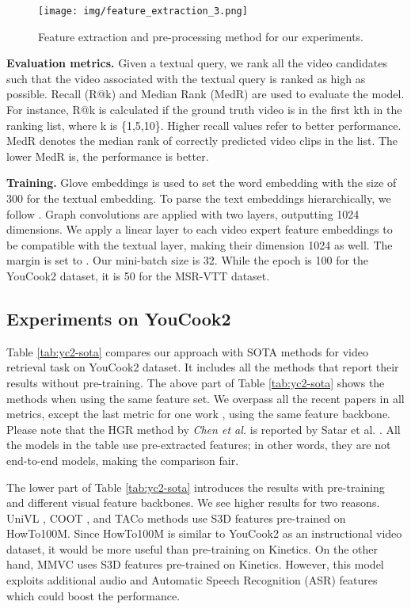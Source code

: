 \documentclass[lettersize,journal]{IEEEtran}
\begin{document}
\begin{figure}[!htb]
\centering
\centerline{\texttt{[image: img/feature\_extraction\_3.png]}}
\centering
\caption{Feature extraction and pre-processing method for our experiments.}
\label{fig:extraction}
\end{figure}

\textbf{Evaluation metrics.} Given a textual query, we rank all the video candidates such that the video associated with the textual query is ranked as high as possible. Recall (R@k) and Median Rank (MedR) are used to evaluate the model. For instance, R@k is calculated if the ground truth video is in the first kth in the ranking list, where k is \{1,5,10\}. Higher recall values refer to better performance. MedR denotes the median rank of correctly predicted video clips in the list. The lower MedR is, the performance is better.

\textbf{Training.} Glove embeddings \cite{pennington-etal-2014-glove} is used to set the word embedding with the size of 300 for the textual embedding. To parse the text embeddings hierarchically, we follow \cite{Chen_2020_CVPR, satar_2021}. Graph convolutions are applied with two layers, outputting 1024 dimensions. We apply a linear layer to each video expert feature embeddings to be compatible with the textual layer, making their dimension 1024 as well. The  margin is set to . Our mini-batch size is 32. While the epoch is 100 for the YouCook2 dataset, it is 50 for the MSR-VTT dataset.

\subsection{Experiments on YouCook2}

Table \ref{tab:yc2-sota} compares our approach with SOTA methods for video retrieval task on YouCook2 dataset. It includes all the methods that report their results without pre-training. The above part of Table \ref{tab:yc2-sota} shows the methods when using the same feature set. We overpass all the recent papers in all metrics, except the last metric for one work \cite{coot}, using the same feature backbone. Please note that the HGR method by \textit{Chen et al.} \cite{Chen_2020_CVPR} is reported by Satar et al. \cite{satar_2021}. All the models in the table use pre-extracted features; in other words, they are not end-to-end models, making the comparison fair.

The lower part of Table \ref{tab:yc2-sota} introduces the results with pre-training and different visual feature backbones. We see higher results for two reasons. UniVL \cite{Luo2020UniVL}, COOT \cite{coot}, and TACo \cite{taco} methods use S3D features pre-trained on HowTo100M. Since HowTo100M is similar to YouCook2 as an instructional video dataset, it would be more useful than pre-training on Kinetics. On the other hand, MMVC \cite{Gabeur2022Masking} uses S3D features pre-trained on Kinetics. However, this model exploits additional audio and Automatic Speech Recognition (ASR) features which could boost the performance.
\end{document}
